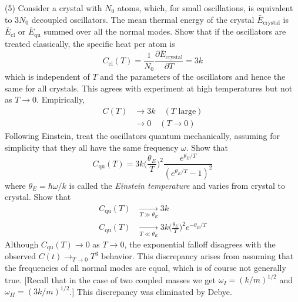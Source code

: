 \documentclass[../principles-of-quantum-mechanics.tex]{subfiles}
\begin{document}
\begin{questions}
		(5) Consider a crystal with $N_0$ atoms, which, for small oscillations, is equivalent to $3N_0$ decoupled oscillators. The mean thermal energy of the crystal $\bar{E}_{\text{crystal}}$ is $\bar{E}_{\text{cl}}$ or $\bar{E}_{\text{qu}}$ summed over all the normal modes. Show that if the oscillators are treated classically, the specific heat per atom is 
		$$C_{\text{cl}}(T) = \frac{1}{N_0}\frac{\partial \bar{E}_{\text{crystal}}}{\partial T} = 3k$$
		which is independent of $T$ and the parameters of the oscillators and hence the same for all crystals. This agrees with experiment at high temperatures but not as $T \to 0$. Empirically,
		\begin{align*}
		C(T) &\to 3k \quad (T\text{ large}) \\
		&\to 0 \quad (T \to 0)
		\end{align*}
		Following Einstein, treat the oscillators quantum mechanically, assuming for simplicity that they all have the same frequency $\omega$. Show that 
		$$C_{\text{qu}}(T) = 3k\Big(\frac{\theta_E}{T}\Big)^2\frac{e^{\theta_E/T}}{(e^{\theta_E/T} - 1)^2}$$
		where $\theta_E = \hbar\omega / k$ is called the \textit{Einstein temperature} and varies from crystal to crystal. Show that
		\begin{align*}
		C_{\text{qu}}(T) &\xrightarrow[T\gg\theta_E]{} 3k \\
		C_{\text{qu}}(T) &\xrightarrow[T \ll \theta_E]{}3k\Big(\frac{\theta_E}{T}\Big)^2e^{-\theta_E/T}
		\end{align*}
		Although $C_{\text{qu}}(T) \to 0$ as $T \to 0$, the exponential falloff disagrees with the observed $C(t) \to_{T \to 0} T^3$ behavior. This discrepancy arises from assuming that the frequencies of all normal modes are equal, which is of course not generally true. [Recall that in the case of two coupled masses we get $\omega_I = (k/m)^{1/2}$ and $\omega_{II}=(3k/m)^{1/2}$.] This discrepancy was eliminated by Debye.
		

\end{questions}
\end{document}
